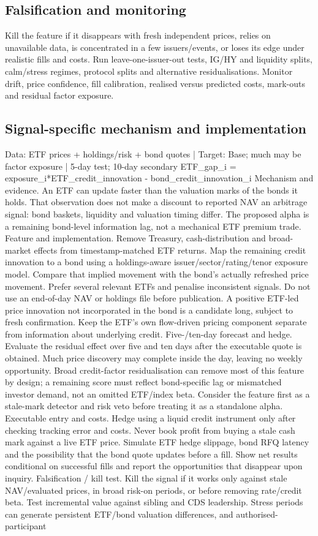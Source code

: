 \documentclass[10pt]{article}
\begin{document}
\subsection{Falsification and monitoring}
Kill the feature if it disappears with fresh independent prices, relies on unavailable data, is concentrated in a few issuers/events, or loses its edge under realistic fills and costs. Run leave-one-issuer-out tests, IG/HY and liquidity splits, calm/stress regimes, protocol splits and alternative residualisations. Monitor drift, price confidence, fill calibration, realised versus predicted costs, mark-outs and residual factor exposure.
\subsection{Signal-specific mechanism and implementation}
Data: ETF prices + holdings/risk + bond quotes  |  Target: Base; much may be factor exposure  |  5-day test; 10-day secondary ETF\_gap\_i = exposure\_i*ETF\_credit\_innovation - bond\_credit\_innovation\_i Mechanism and evidence.  An ETF can update faster than the valuation marks of the bonds it holds. That observation does not make a discount to reported NAV an arbitrage signal: bond baskets, liquidity and valuation timing differ. The proposed alpha is a remaining bond-level information lag, not a mechanical ETF premium trade. Feature and implementation.  Remove Treasury, cash-distribution and broad-market effects from timestamp-matched ETF returns. Map the remaining credit innovation to a bond using a holdings-aware issuer/sector/rating/tenor exposure model. Compare that implied movement with the bond’s actually refreshed price movement. Prefer several relevant ETFs and penalise inconsistent signals. Do not use an end-of-day NAV or holdings file before publication. A positive ETF-led price innovation not incorporated in the bond is a candidate long, subject to fresh confirmation. Keep the ETF’s own flow-driven pricing component separate from information about underlying credit. Five-/ten-day forecast and hedge.  Evaluate the residual effect over five and ten days after the executable quote is obtained. Much price discovery may complete inside the day, leaving no weekly opportunity. Broad credit-factor residualisation can remove most of this feature by design; a remaining score must reflect bond-specific lag or mismatched investor demand, not an omitted ETF/index beta. Consider the feature first as a stale-mark detector and risk veto before treating it as a standalone alpha. Executable entry and costs.  Hedge using a liquid credit instrument only after checking tracking error and costs. Never book profit from buying a stale cash mark against a live ETF price. Simulate ETF hedge slippage, bond RFQ latency and the possibility that the bond quote updates before a fill. Show net results conditional on successful fills and report the opportunities that disappear upon inquiry. Falsification / kill test.  Kill the signal if it works only against stale NAV/evaluated prices, in broad risk-on periods, or before removing rate/credit beta. Test incremental value against sibling and CDS leadership. Stress periods can generate persistent ETF/bond valuation differences, and authorised-participant 
\end{document}

